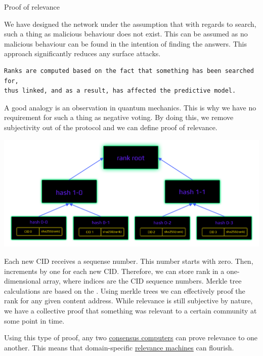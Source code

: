 \documentclass[8pt,oneside]{amsart}
\makeatletter
\newcommand{\linkgreen}[2]{\href{#1}{\color{green}{#2}}}
\renewcommand\subsection{\@startsection{subsection}
                                    {2}{\z@}
                                    {-3.25ex\@plus -1ex \@minus -.2ex}
                                    {0ex \@plus .2ex}
                                    {\play\Large}
                        }
\newcommand{\titleSection}[1]{\subsection{#1}}
\newenvironment{Figure}
  {\par\medskip\noindent\minipage{\linewidth}}
  {\endminipage\par\medskip}
\makeatother
\begin{document}
\titleSection{Proof of relevance}\label{proof-of-relevance}

We have designed the network under the assumption that with regards to search, such a thing as malicious behaviour does not exist. This can be assumed as no malicious behaviour can be found in the intention of finding the answers. This approach significantly reduces any surface attacks.

\begin{lstlisting}
Ranks are computed based on the fact that something has been searched for,
thus linked, and as a result, has affected the predictive model.
\end{lstlisting}

A good analogy is an observation in quantum mechanics. This is why we have no requirement for such a thing as negative voting. By doing this, we remove subjectivity out of the protocol and we can define proof of relevance.

\begin{Figure}
    \centering
    \includegraphics[width=1\textwidth]{rank-tree.png}
\end{Figure}

Each new CID receives a sequense number. This number starts with zero. Then, increments by one for each new CID. Therefore, we can store rank in a one-dimensional array, where indices are the CID sequence numbers. Merkle tree calculations are based on the \linkgreen{https://tools.ietf.org/html/rfc6962#section-2.1}{RFC-6962 standard}. Using merkle trees we can effectively proof the rank for any given content address. While relevance is still subjective by nature, we have a collective proof that something was relevant to a certain community at some point in time.

Using this type of proof, any two \linkgreen{https://ipfs.io/ipfs/QmdCeixQUHBjGnKfwbB1dxf4X8xnadL8xWmmEnQah5n7x2}{IBC compatible} {\hyperref[consensus-computer]{consensus computers}} can prove relevance to one another. This means that domain-specific {\hyperref[relevance-machine]{relevance machines}} can flourish.
\end{document}
